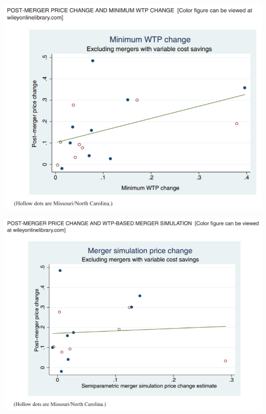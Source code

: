 \documentclass{beamer}
\begin{document}
\begin{frame}
            \includegraphics[width=\linewidth,height=\textheight,keepaspectratio]{wtp.PNG} \\
    
\end{frame}
\begin{frame}
            \includegraphics[width=\linewidth,height=\textheight,keepaspectratio]{msim.PNG} \\
    
\end{frame}
\end{document}
